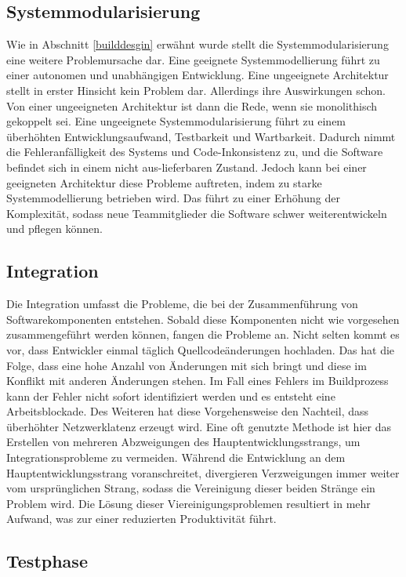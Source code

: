 \subsection{Systemmodularisierung}  \label{Systemmodularisierung}
Wie in Abschnitt \ref{builddesgin} erwähnt wurde stellt die Systemmodularisierung eine weitere Problemursache dar. Eine geeignete Systemmodellierung führt zu einer autonomen und unabhängigen Entwicklung. Eine ungeeignete Architektur stellt in erster Hinsicht kein Problem dar. Allerdings ihre Auswirkungen schon. Von einer ungeeigneten Architektur ist dann die Rede, wenn sie monolithisch gekoppelt sei. Eine ungeeignete Systemmodularisierung führt zu einem überhöhten Entwicklungsaufwand, Testbarkeit und Wartbarkeit. Dadurch nimmt die Fehleranfälligkeit des Systems und Code-Inkonsistenz zu, und die Software befindet sich in einem nicht aus-lieferbaren Zustand. Jedoch kann bei einer geeigneten Architektur diese Probleme auftreten, indem zu starke Systemmodellierung betrieben wird. Das führt zu einer Erhöhung der Komplexität, sodass neue Teammitglieder die Software schwer weiterentwickeln und pflegen können. 

\subsection{Integration} \label{Integration}
Die Integration umfasst die Probleme, die bei der Zusammenführung von Softwarekomponenten entstehen. Sobald diese Komponenten nicht wie vorgesehen zusammengeführt werden können, fangen die Probleme an. Nicht selten kommt es vor, dass Entwickler einmal täglich Quellcodeänderungen hochladen. Das hat die Folge, dass eine hohe Anzahl von Änderungen mit sich bringt und diese im Konflikt mit anderen Änderungen stehen. Im Fall eines Fehlers im Buildprozess kann der Fehler nicht sofort identifiziert werden und es entsteht eine Arbeitsblockade. Des Weiteren hat diese Vorgehensweise den Nachteil, dass überhöhter Netzwerklatenz erzeugt wird. Eine oft genutzte Methode ist hier das Erstellen von mehreren Abzweigungen des Hauptentwicklungsstrangs, um Integrationsprobleme zu vermeiden. Während die Entwicklung an dem Hauptentwicklungsstrang voranschreitet, divergieren Verzweigungen immer weiter vom ursprünglichen Strang, sodass die Vereinigung dieser beiden Stränge ein Problem wird. Die Lösung dieser Viereinigungsproblemen resultiert in mehr Aufwand, was zur einer reduzierten Produktivität führt. 

\subsection{Testphase}

